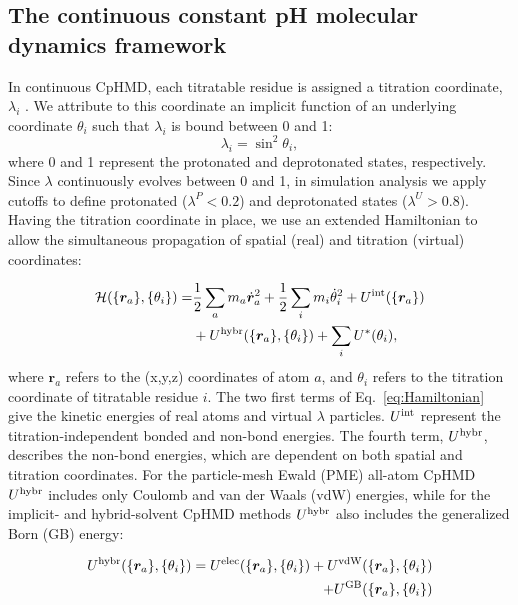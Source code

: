 \subsection{The continuous constant pH molecular dynamics framework}

In continuous CpHMD, each titratable residue is assigned a titration coordinate, $\lambda_i$ \cite{Lee_Brooks_2004_Proteins,Khandogin_Brooks_2005_Biophys.J.}. 
We attribute to this coordinate an implicit function of an underlying coordinate $\theta_i$ such that $\lambda_i$ is bound between 0 and 1:
\begin{equation}
    \lambda_i = \sin^2\theta_i,
\end{equation}
where 0 and 1 represent the protonated and deprotonated states, respectively. 
Since $\lambda$ continuously evolves between 0 and 1,
in simulation analysis we apply cutoffs to define
protonated ($\lambda^P < 0.2$) and deprotonated states ($\lambda^U > 0.8$). 
Having the titration coordinate in place, we use an extended Hamiltonian to allow the simultaneous propagation of spatial (real) and titration (virtual) coordinates:

\begin{equation}
\begin{split}
\label{eq:Hamiltonian}
\mathcal{H}(\{\bm{r}_a\},\{\theta_i\})=
&\frac{1}{2}\sum_am_a\dot{\bm{r}}_a^2+\frac{1}{2}\sum_im_i\dot{\theta}_i^2+U^{\rm int}(\{\bm{r}_a\})\\
&+U^{\rm hybr}(\{\bm{r}_a\},\{\theta_i\})+\sum_iU^{\ast}(\theta_i),
\end{split}
\end{equation}
where $\bm{r}_a$ refers to the (x,y,z) coordinates
of atom $a$, and $\theta_i$ refers to the titration coordinate of titratable residue $i$. 
The two first terms of Eq.~\ref{eq:Hamiltonian} give the kinetic energies of real atoms and virtual $\lambda$ particles. 
$U^{\rm int}$ represent the titration-independent bonded and non-bond energies. 
The fourth term, $U^{\rm hybr}$, describes the 
non-bond energies, which are dependent on both spatial and titration coordinates. 
For the particle-mesh Ewald (PME) all-atom CpHMD
\cite{Huang_Shen_2016_J.Chem.TheoryComput.}
$U^{\rm hybr}$ includes only Coulomb and van der Waals (vdW) energies, while for
the implicit- and hybrid-solvent CpHMD methods $U^{\rm hybr}$ also includes the generalized Born (GB) energy:
 
 \begin{equation}
\label{eq:Uhybr}
\begin{split}
U^{\rm hybr}(\{\bm{r}_a\},\{\theta_i\})=U^{\rm elec}(\{\bm{r}_a\},\{\theta_i\}) 
+ U^{\rm vdW}(\{\bm{r}_a\},\{\theta_i\})\\
+ U^{\rm GB}(\{\bm{r}_a\},\{\theta_i\})
\end{split}
\end{equation}

